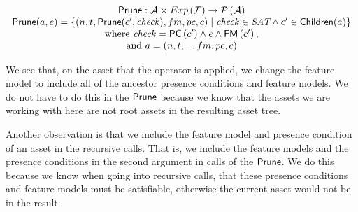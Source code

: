 \[
  \begin{array}{c}\def\arraystretch{1.4}
    \filterchildrenfunc : \binaryFunc{\allassets}{\expressions{\features}}{\powerset{\allassets}} \\
    \def\arraystretch{1}
    \filterchildrenfunc(a, e) = 
      \left\{
        (
          n,
          t,
          \filterchildrenfunc(c', \mathit{check}),
          fm,
          pc,
          c
        ) 
        \hspace*{1mm} \middle| \hspace*{1mm}
        \mathit{check} \in \sat 
        \land c' \in \childrenfunc(a) 
      \right\} \\
    \text{where }\mathit{check} = \presenceconditionfunc\left( c' \right) \land e \land \featuremodelfunc\left(c'\right)\text{,} \\
    \text{and }a = \left( n, t, \_, fm, pc, c \right)
  \end{array}
\]

We see that, on the asset that the operator is applied, we change the feature
model to include all of the ancestor presence conditions and feature models.
We do not have to do this in the \({\sf Prune}\) because we know that
the assets we are working with here are not root assets in the resulting asset
tree.

Another observation is that we include the feature model and presence
condition of an asset in the recursive calls. That is, we include the
feature models and the presence conditions in the second argument in calls of
the \({\sf Prune}\). We do this because we know when going into
recursive calls, that these presence conditions and feature models must be
satisfiable, otherwise the current asset would not be in the result.


